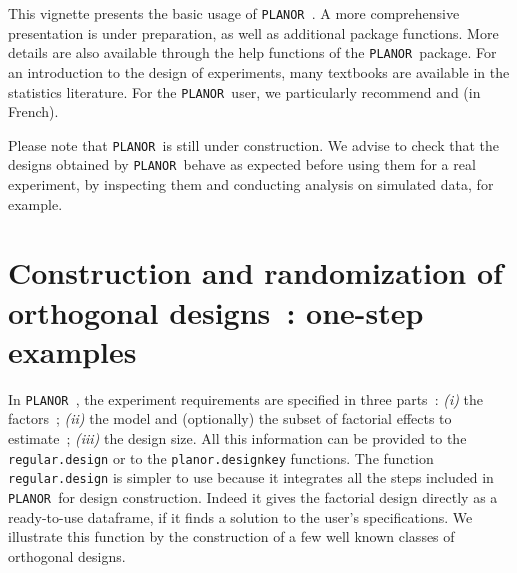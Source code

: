 \documentclass[a4paper]{article}
\newcommand{\PLANOR}{\texttt{PLANOR }}
\begin{document}
This vignette presents the basic usage of \PLANOR. A more
comprehensive presentation is under preparation, as well as additional
package functions. More details are also available through the help
functions of the \PLANOR package. For an introduction to the design of
experiments, many textbooks are available in the statistics
literature. For the \PLANOR user, we particularly recommend
\cite{bai08} and \cite{kobiasu97} (in French).

Please note that \PLANOR is still under construction. We advise to
check that the designs obtained by \PLANOR behave as expected before
using them for a real experiment, by inspecting them and conducting
analysis on simulated data, for example.

\section{Construction and randomization of orthogonal designs~: one-step examples}
In \PLANOR, the experiment requirements are specified in three parts~:
\emph{(i)} the factors~; \emph{(ii)} the model and (optionally) the
subset of factorial effects to estimate~; \emph{(iii)} the design
size. All this information can be provided to the
\texttt{regular.design} or to the \texttt{planor.designkey} functions.
The function \texttt{regular.design} is simpler to use because it
integrates all the steps included in \PLANOR for design construction.
Indeed it gives the factorial design directly as a ready-to-use
dataframe, if it finds a solution to the user's specifications. We
illustrate this function by the construction of a few well known
classes of orthogonal designs.
\end{document}
